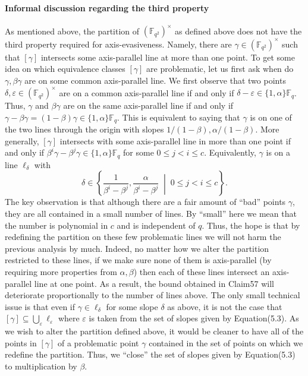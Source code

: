 \paragraph{Informal discussion regarding the third property}
As mentioned above, the partition of $(\mathbb F_{q^2})^\times$ as defined above does not have the third property required for axis-evasiveness. Namely, there are $\gamma\in(\mathbb F_{q^2})^\times$ such that $[\gamma]$ intersects some axis-parallel line at more than one point. To get some idea on which equivalence classes $[\gamma]$ are problematic, let us first ask when do $\gamma,\beta\gamma$ are on some common axis-parallel line. We first observe that two points $\delta,\varepsilon\in(\mathbb F_{q^2})^\times$ are on a common axis-parallel line if and only if $\delta-\varepsilon\in\{1,\alpha\}\mathbb F_q$. Thus, $\gamma$ and $\beta\gamma$ are on the same axis-parallel line if and only if $\gamma-\beta\gamma=(1-\beta)\gamma\in\{1,\alpha\}\mathbb F_q$. This is equivalent to saying that $\gamma$ is on one of the two lines through the origin with slopes $1/(1-\beta),\alpha/(1-\beta)$.
More generally, $[\gamma]$ intersects with some axis-parallel line in more than one point if and only if $\beta^i\gamma-\beta^j\gamma\in\{1,\alpha\}\mathbb F_q$ for some $0\leq j<i\leq c$. Equivalently, $\gamma$ is on a line $\ell_\delta$ with
\begin{equation}\delta\in\left\{\frac1{\beta^i-\beta^j},\frac\alpha{\beta^i-\beta^j}\;\middle|\;0\leq j<i\leq c\right\}.\tag{5.3}\end{equation}
The key observation is that although there are a fair amount of ``bad'' points $\gamma$, they are all contained in a small number of lines. By ``small'' here we mean that the number is polynomial in $c$ and is independent of $q$. Thus, the hope is that by redefining the partition on these few problematic lines we will not harm the previous analysis by much. Indeed, no matter how we alter the partition restricted to these lines, if we make sure none of them is axis-parallel (by requiring more properties from $\alpha,\beta$) then each of these lines intersect an axis-parallel line at one point. As a result, the bound obtained in Claim57 will deteriorate proportionally to the number of lines above.
The only small technical issue is that even if $\gamma\in\ell_\delta$ for some slope $\delta$ as above, it is not the case that $[\gamma]\subseteq\bigcup_\varepsilon\ell_\varepsilon$ where $\varepsilon$ is taken from the set of slopes given by Equation(5.3). As we wish to alter the partition defined above, it would be cleaner to have all of the points in $[\gamma]$ of a problematic point $\gamma$ contained in the set of points on which we redefine the partition. Thus, we ``close'' the set of slopes given by Equation(5.3) to multiplication by $\beta$.
